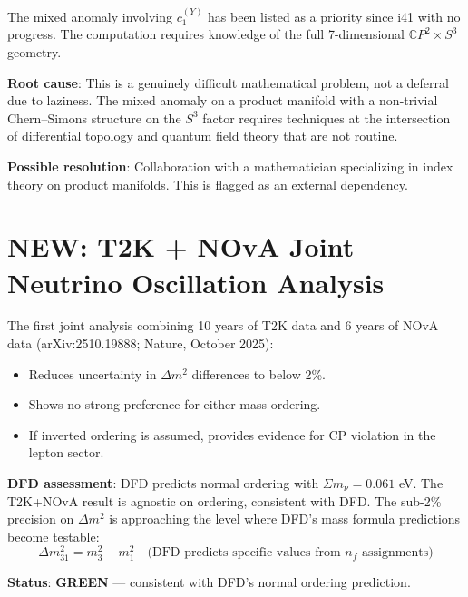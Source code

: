 \documentclass[11pt,a4paper]{article}
\newcommand{\GREEN}{\textcolor{dfdgreen}{\textbf{GREEN}}}
\newcommand{\NEW}{\textcolor{dfdblue}{\textbf{NEW}}}
\newcommand{\CP}{\mathbb{C}P}
\begin{document}
\begin{tcolorbox}[colback=red!5!white, colframe=red!60!black,
  title={HONEST: Mixed anomaly deferred for 5 iterations (i41--i45)}]

The mixed anomaly involving $c_1^{(Y)}$ has been listed as a priority since i41 with no progress. The computation requires knowledge of the full 7-dimensional $\CP^2 \times S^3$ geometry.

\textbf{Root cause}: This is a genuinely difficult mathematical problem, not a deferral due to laziness. The mixed anomaly on a product manifold with a non-trivial Chern--Simons structure on the $S^3$ factor requires techniques at the intersection of differential topology and quantum field theory that are not routine.

\textbf{Possible resolution}: Collaboration with a mathematician specializing in index theory on product manifolds. This is flagged as an external dependency.
\end{tcolorbox}

\section{\NEW: T2K + NOvA Joint Neutrino Oscillation Analysis}

\begin{tcolorbox}[colback=blue!5!white, colframe=blue!60!black,
  title={Nature (October 2025): First Joint T2K--NOvA Analysis}]

The first joint analysis combining 10 years of T2K data and 6 years of NOvA data (arXiv:2510.19888; Nature, October 2025):
\begin{itemize}
\item Reduces uncertainty in $\Delta m^2$ differences to below 2\%.
\item Shows no strong preference for either mass ordering.
\item If inverted ordering is assumed, provides evidence for CP violation in the lepton sector.
\end{itemize}

\textbf{DFD assessment}: DFD predicts normal ordering with $\Sigma m_\nu = 0.061$ eV. The T2K+NOvA result is agnostic on ordering, consistent with DFD. The sub-2\% precision on $\Delta m^2$ is approaching the level where DFD's mass formula predictions become testable:
\begin{equation}
\Delta m^2_{31} = m_3^2 - m_1^2 \quad \text{(DFD predicts specific values from } n_f \text{ assignments)}
\end{equation}

\textbf{Status}: \GREEN{} --- consistent with DFD's normal ordering prediction.
\end{tcolorbox}
\end{document}
